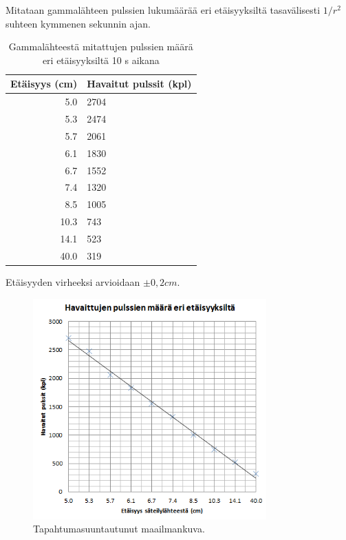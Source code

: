 \documentclass[a4paper,11pt]{article}
\begin{document}
Mitataan gammalähteen pulssien lukumäärää eri etäisyyksiltä tasavälisesti $1/r^2$ suhteen kymmenen sekunnin ajan. 

\begin{table}[ht]
\begin{center}
\caption{Gammalähteestä mitattujen pulssien määrä eri etäisyyksiltä 10 s aikana}
\begin{tabular}{ | r | l | }
  \hline
Etäisyys (cm) & Havaitut pulssit (kpl) \\ \hline
5.0 & 2704 \\ \hline
5.3 & 2474 \\ \hline
5.7 & 2061 \\ \hline
6.1 & 1830 \\ \hline
6.7 & 1552 \\ \hline
7.4 & 1320 \\ \hline
8.5 & 1005 \\ \hline
10.3 & 743 \\ \hline
14.1 & 523 \\ \hline
40.0 & 319 \\ \hline
\end{tabular}
\end{center}
\end{table}

Etäisyyden virheeksi arvioidaan $\pm 0,2 cm$.

\begin{figure}[ht]
\centering \includegraphics[width=0.8\textwidth]{gamma1}
\caption{Tapahtumasuuntautunut maailmankuva. \label{gamma1}}
\end{figure}
\end{document}
